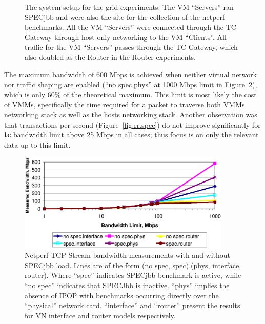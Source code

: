 \begin{figure}
\centering
{}
\caption[Grid evaluation setup]{The system setup for the grid experiments.  The
VM ``Servers'' ran SPECjbb and were also the site for the collection of the
netperf benchmarks.  All the VM ``Servers'' were connected through the TC
Gateway through host-only networking to the VM ``Clients''.  All traffic for
the VM ``Servers'' passes through the TC Gateway, which also doubled as the
Router in the Router experiments.}
\label{fig:gridsetup}
\end{figure}

The maximum bandwidth of 600 Mbps is achieved when neither virtual network nor
traffic shaping are enabled (``no spec.phys'' at 1000 Mbps limit in
Figure~\ref{fig:stream.netperf}), which is only 60\% of the theoretical
maximum.  This limit is most likely the cost of VMMs, specifically the time
required for a packet to traverse both VMMs networking stack as well as the
hosts networking stack.  Another observation was that transactions per second
(Figure~\ref{fig:rr.spec}) do not improve significantly for \textbf{tc}
bandwidth limit above 25 Mbps in all cases; thus focus is on only the relevant
data up to this limit.

\begin{figure}
\centering
\includegraphics[width=4in]{figs/stream.netperf.jpg.eps}
\caption[Grid Netperf bandwidth evaluation]{Netperf TCP Stream bandwidth
measurements with and without SPECjbb load.  Lines are of the form (no spec,
spec).(phys, interface, router).  Where ``spec'' indicates SPECjbb benchmark is
active, while ``no spec'' indicates that SPECJbb is inactive. ``phys'' implies
the absence of IPOP with benchmarks occurring directly over the ``physical''
network card.  ``interface'' and ``router'' present the results for VN
interface and router models respectively.}
\label{fig:stream.netperf}
\end{figure}

